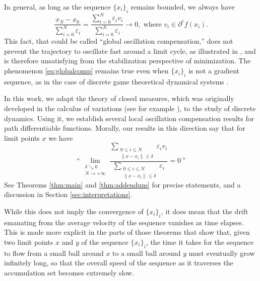 \documentclass[11pt]{article}
\theoremstyle{definition}
\theoremstyle{remark}
\newcommand{\N}{\mathbb{N}}
\renewcommand{\leq}{\leqslant}
\begin{document}
In general, as long as the sequence $\{x_i\}_i$ remains bounded, we always have
\begin{equation}\label{eq:globalcomp}
 \frac{x_N-x_0}{\sum_{i=0}^N\varepsilon_i}=\frac{\sum_{i=0}^N\varepsilon_iv_i}{\sum_{i=0}^N\varepsilon_i}\to 0, \mbox{ where $v_i\in \partial^cf(x_i)$}.
\end{equation}
This fact, that could be called ``global oscillation compensation,'' does not prevent the trajectory to oscillate fast around a limit cycle, as illustrated in \cite{daniilidisdrusvyatskiy}, and is therefore unsatisfying from the stabilization perspective of minimization. The phenomenon \eqref{eq:globalcomp} remains true even when $\{x_i\}_i$ is not a gradient sequence, as in the case of discrete game theoretical dynamical systems \cite{BHS}.

%
%
%



In this work, we adapt the theory of closed measures, which was originally developed in the calculus of variations (see for example \cite{bangert1999minimal,patrick}), to the study of discrete dynamics. Using it, we establish several local oscillation compensation results for path differentiable functions. Morally, our results in this direction say that for limit points $x$ we have
\begin{equation}\label{eq:intuitivecompensation}
\textrm{``}\,\lim_{\substack{\delta\searrow0\\N\to+\infty}}\frac{\displaystyle\sum_{\substack{0\leq i\leq N\\ \|x-x_i\|\leq \delta}}\varepsilon_iv_i}{\displaystyle\sum_{\substack{0\leq i\leq N\\ \|x-x_i\|\leq \delta}}\varepsilon_i}=0\,\textrm{''}
\end{equation}
%
%
%
%
See Theorems \ref{thm:main} and \ref{thm:addendum} for precise statements, and a discussion in Section \ref{sec:interpretations}.%
%
%


While this does not imply the convergence of $\{x_i\}_i$, it does mean that the drift emanating from the average velocity of the sequence  vanishes as time elapses. This is made  more explicit in the parts of those theorems that show that, given two limit points $x$ and $y$ of the sequence $\{x_i\}_i$, the time it takes for the sequence to flow from a small ball around $x$ to a small ball around $y$ must eventually grow infinitely long, so that the overall speed of the sequence as it traverses the accumulation set becomes extremely slow.
\end{document}
